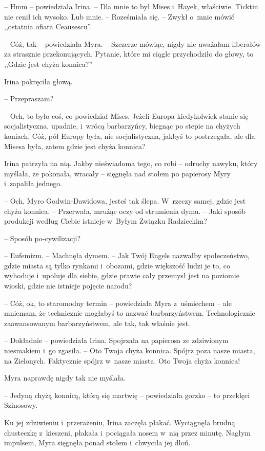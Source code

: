 \documentclass[oneside,polish,11pt,sfheadings]{mwbk}
\begin{document}
-- Hmm -- powiedziała Irina. -- Dla mnie to był Mises i~Hayek, właściwie.
Ticktin nie cenił ich wysoko. Lub mnie. -- Roześmiała się. -- Zwykł o~mnie
mówić ,,ostatnia ofiara Ceausescu''.

-- Cóż, tak -- powiedziała Myra. -- Szczerze mówiąc, nigdy nie uważałam
liberałów za strasznie przekonujących. Pytanie, które mi ciągle
przychodziło do głowy, to ,,Gdzie jest chyża konnica?''

Irina pokręciła głową. 

-- Przepraszam?

-- Och, to było coś, co powiedział Mises. Jeżeli Europa kiedykolwiek
stanie się socjalistyczna, upadnie, i~wrócą barbarzyńcy, biegnąc po
stepie na chyżych koniach. Cóż, pół Europy była, nie socjalistyczna,
jakbyś to postrzegała, ale dla Misesa była, zatem gdzie jest chyża
konnica?

Irina patrzyła na nią. Jakby nieświadoma tego, co robi -- odruchy nawyku,
który myślała, że pokonała, wracały -- sięgnęła nad stołem po papierosy
Myry i~zapaliła jednego.

-- Och, Myro Godwin-Dawidowa, jesteś tak ślepa. W~rzeczy samej, gdzie
jest chyża konnica. -- Przerwała, mrużąc oczy od strumienia dymu. -- Jaki
sposób produkcji według Ciebie istnieje w~Byłym Związku Radzieckim?

-- Sposób po-cywilizacji?

-- Eufemizm. -- Machnęła dymem. -- Jak Twój Engels nazwałby społeczeństwo,
gdzie miasta są tylko rynkami i~obozami, gdzie większość ludzi je to, co
wyhoduje i~upoluje dla siebie, gdzie prawie cały przemysł jest na
poziomie wioski, gdzie nie istnieje pojęcie narodu?

-- Cóż, ok, to staromodny termin -- powiedziała Myra z~uśmiechem -- ale
mniemam, że technicznie mogłabyś to nazwać barbarzyństwem.
Technologicznie zaawansowanym barbarzyństwem, ale tak, tak właśnie jest.

-- Dokładnie -- powiedziała Irina. Spojrzała na papierosa ze zdziwionym
niesmakiem i~go zgasiła. -- Oto Twoja chyża konnica. Spójrz poza nasze
miasta, na Zielonych. Faktycznie spójrz w~nasze miasta. Oto Twoja chyża
konnica!

Myra naprawdę nigdy tak nie myślała.

-- Jedyną chyżą konnicą, którą się martwię -- powiedziała gorzko -- to
przeklęci Szinosowy.

Ku jej zdziwieniu i~przerażeniu, Irina zaczęła płakać. Wyciągnęła brudną
chusteczkę z~kieszeni, płakała i~pociągała nosem w~nią przez minutę.
Nagłym impulsem, Myra sięgnęła ponad stołem i~chwyciła jej dłoń.
\end{document}
